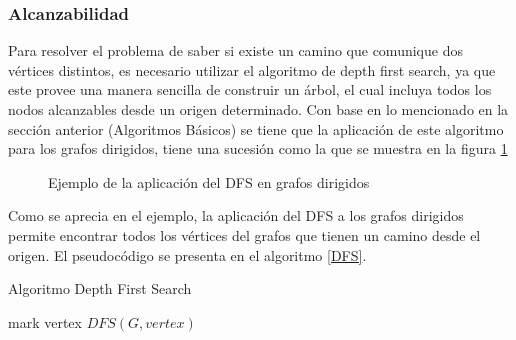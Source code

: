 \documentclass[a4paper, 11pt]{report}
\newcommand{\DrawGraph}[5]{

    \begin{scope}[#4]
    \foreach \pos/\nodo in {{(0,0)/1}, {(2,1)/2}, {(4,1)/3}, {(0,2)/4}, {(3,0)/5}, {(2,-1)/6}, {(4,-1)/7}}
        \node[vertex] (#3\nodo) at \pos {\nodo};

    \foreach \start/\end in {1/4, 1/2, 1/6,2/5,2/3,2/6,5/7,3/7,4/2,6/7}
        \path[edge,#5] (#3\start) -- (#3\end);

    \foreach \nodo in {#1}
        \node[selected vertex] at (#3\nodo) {\nodo};
        

    \begin{pgfonlayer}{background}
        \foreach \start/\end in {#2}
            \path[selected edge,#5] (#3\start) -- (#3\end);
    \end{pgfonlayer}
    \end{scope}
}
\newcommand{\DrawArrow}[1]{
    \begin{scope}[scale=0.5,#1]
        \filldraw[arrow] (0,0) -- (2,0) -- +(270:0.5) -- (3,0.5) -- (2,1.5) -- +(270:0.5) -- (0,1) -- cycle;
    \end{scope}
}
\newcommand{\Deactivate}{\shorthandoff{<>."}}
\newcommand{\Activate}{\shorthandon{<>."}}
\begin{document}
\subsubsection{Alcanzabilidad}
Para resolver el problema de saber si existe un camino que comunique dos v\'ertices distintos, es necesario utilizar el algoritmo de depth first search, ya que este provee una manera sencilla de construir un \'arbol, el cual incluya todos los nodos alcanzables desde un origen determinado. Con base en lo mencionado en la secci\'on anterior (Algoritmos B\'asicos) se tiene que la aplicaci\'on de este algoritmo para los grafos dirigidos, tiene una sucesi\'on como la que se muestra en la figura \ref{Alcanzabilidad}

\begin{figure}[!h]
    \centering
    \caption{Ejemplo de la aplicaci\'on del DFS en grafos dirigidos}
    \label{Alcanzabilidad}
\end{figure}

Como se aprecia en el ejemplo, la aplicaci\'on del DFS a los grafos dirigidos permite encontrar todos los v\'ertices del grafos que tienen un camino desde el origen. El pseudoc\'odigo se presenta en el algoritmo \ref{DFS}.

\begin{algorithm}[!h]
\caption{Algoritmo Depth First Search}
\label{DFS}
\begin{algorithmic}
                \State mark vertex
                \State $DFS(G,vertex)$
            \EndIf 
        \EndFor
    \EndProcedure
\end{algorithmic}
\end{algorithm}
\end{document}
